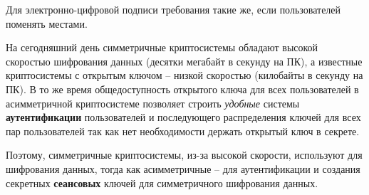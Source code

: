 Для электронно-цифровой подписи требования такие же, если пользователей поменять местами.

На сегодняшний день симметричные криптосистемы обладают высокой скоростью шифрования данных (десятки мегабайт в секунду на ПК), а известные криптосистемы с открытым ключом -- низкой скоростью (килобайты в секунду на ПК). В то же время общедоступность открытого ключа для всех пользователей в асимметричной криптосистеме позволяет строить \emph{удобные} системы \textbf{аутентификации} пользователей и последующего распределения ключей для всех пар пользователей так как нет необходимости держать открытый ключ в секрете.

Поэтому, симметричные криптосистемы, из-за высокой скорости, используют для шифрования данных, тогда как асимметричные -- для аутентификации и создания секретных \textbf{сеансовых} ключей для симметричного шифрования данных.
